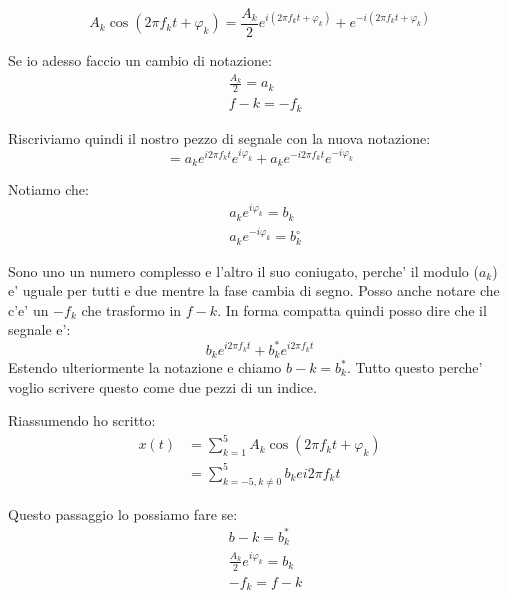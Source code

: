 \begin{equation}
    A_k \cos (2\pi f_k t + \varphi_k) = \frac{A_k}{2} {e^{i(2\pi f_k t + \varphi_k)} + e^{-i(2\pi f_k t + \varphi_k)} }
\end{equation}

Se io adesso faccio un cambio di notazione:
\begin{equation}\begin{split}
    &\frac{A_k}{2} = a_k \\
    &f-k = -f_k
\end{split}\end{equation}

Riscriviamo quindi il nostro pezzo di segnale con la nuova notazione:
\begin{equation}
    = a_k e ^{i 2\pi f_k t} e^{i \varphi_k} + a_k e ^{-i 2\pi f_k t} e^{-i \varphi_k}
\end{equation}

Notiamo che:
\begin{equation}\begin{split}
    &a_k e^{i \varphi_k} = b_k \\
    &a_k e^{-i \varphi_k} = b_k^{\circ}
\end{split}\end{equation}

Sono uno un numero complesso e l'altro il suo coniugato, perche' il modulo ($a_k$) e' uguale per tutti e due mentre la fase cambia di segno.
Posso anche notare che c'e' un $-f_k$ che trasformo in $f-k$.
In forma compatta quindi posso dire che il segnale e':
\begin{equation}
    b_k e^{i 2\pi f_k t} + b_k^{*} e^{i 2\pi f_k t}
\end{equation}
Estendo ulteriormente la notazione e chiamo $b-k = b_k^{*}$. Tutto questo perche' voglio scrivere questo come due pezzi di un indice.

Riassumendo ho scritto:
\begin{equation}\begin{split}
    x(t) &= \sum_{k = 1}^{5} A_k \cos (2\pi f_k t + \varphi_k) \\
    &= \sum_{k = -5, k \neq 0}^{5} b_k e{i 2 \pi f_k t}
\end{split}\end{equation}

Questo passaggio lo possiamo fare se:
\begin{equation}\begin{split}
    &b-k = b_k^* \\
    &\frac{A_k}{2} e^{i \varphi_k} = b_k \\
    &-f_k = f-k
\end{split}\end{equation}

